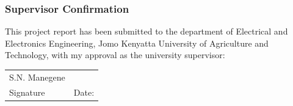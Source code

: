 \subsubsection*{Supervisor Confirmation}
This project report has been submitted to the department of Electrical and Electronics Engineering, Jomo Kenyatta University of Agriculture and Technology, with my approval as the university supervisor:

\begin{table}[!h]
	\renewcommand{\arraystretch}{2}
	\begin{tabular}{l l}
		S.N. Manegene &  \\[10pt]
		Signature \dotuline{\hspace{3cm}}& \hspace{3cm} Date: \dotuline{\hspace{3cm}} \\
	\end{tabular}
\end{table}	
